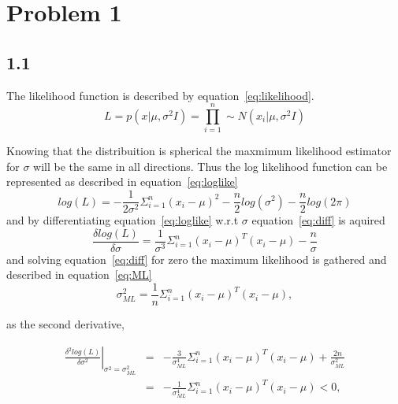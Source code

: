 \documentclass{article}
\begin{document}



\section*{Problem 1}
\subsection*{1.1}

The likelihood function is described by equation~\ref{eq:likelihood}.
\begin{equation}
L = p(x|\mu,\sigma^2I) = \prod_{i=1}^n \sim  {N}(x_i|\mu,\sigma^2I)
\label{eq:likelihood}
\end{equation}


\noindent Knowing that the distribuition is spherical the maxmimum likelihood estimator for $\sigma$ will be the same in all directions. Thus the log likelihood function can be represented as described in equation~\ref{eq:loglike}
\begin{equation}
log(L) =-\frac{1}{2\sigma^2}\Sigma_{i=1}^n(x_i-\mu)^2 - \frac{n}{2}log(\sigma^2) - \frac{n}{2}log(2\pi)
\label{eq:loglike}
\end{equation}
and by differentiating equation~\ref{eq:loglike} w.r.t $\sigma$ equation~\ref{eq:diff} is aquired
\begin{equation}
	\frac{\delta log(L)}{\delta \sigma} = \frac{1}{\sigma^3}\Sigma_{i=1}^n(x_i-\mu)^T(x_i-\mu) - \frac{n}{\sigma}
	\label{eq:diff}
\end{equation}
and solving equation~\ref{eq:diff} for zero the maximum likelihood is gathered and described in equation~\ref{eq:ML}
\begin{equation}
	\sigma_{ML}^2 = \frac{1}{n}\Sigma_{i=1}^n(x_i-\mu)^T(x_i-\mu),
	\label{eq:ML}
\end{equation}

as the second derivative,

\begin{equation}
\begin{array}{rcl}
\left.\frac{\delta^2 log(L)}{\delta\sigma^2}\right|_{\sigma^2=\sigma_{ML}^2} & = & -\frac{3}{\sigma^4_{ML}}\Sigma_{i=1}^{n}(x_i-\mu)^T(x_i-\mu)+\frac{2n}{\sigma^2_{ML}}\\
& = & -\frac{1}{\sigma^4_{ML}}\Sigma_{i=1}^{n}(x_i-\mu)^T(x_i-\mu) < 0,
\end{array}
\end{equation}
\end{document}
